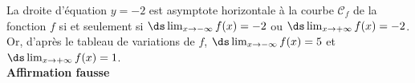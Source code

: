 La droite d'équation $y = -2$ est asymptote horizontale à la courbe $\mathcal{C}_f$ de la fonction $f$ si et seulement si $\ds\lim_{x\to -\infty} f(x)=-2$ ou $\ds\lim_{x\to +\infty} f(x)=-2$.\\
Or, d'après le tableau de variations de $f$, $\ds\lim_{x\to -\infty} f(x)=5$ et $\ds\lim_{x\to +\infty} f(x)=1$.\\
\hfill\textbf{Affirmation fausse}